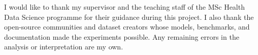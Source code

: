 I would like to thank my supervisor and the teaching staff of the MSc Health Data Science programme for their guidance during this project. I also thank the open-source communities and dataset creators whose models, benchmarks, and documentation made the experiments possible. Any remaining errors in the analysis or interpretation are my own.
